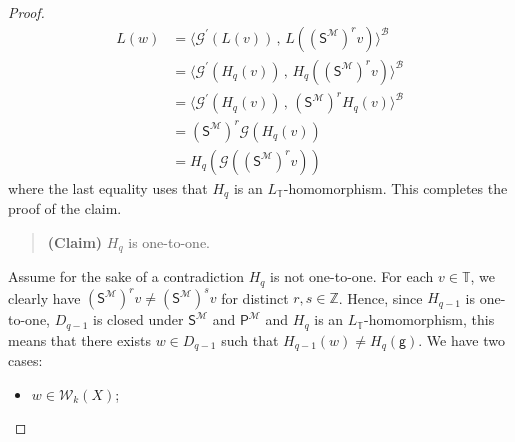 \documentclass[10pt,a4paper, openany,  oldfontcommands]{memoir}
\newtheorem{open problem} [theorem] {Open Problem}
\newtheorem{open question} [theorem] {Open Question}
\renewcommand{\mathrm}{\mathsf}
\begin{document}
\begin{proof}
\begin{align*}
L(w)    
&=  
 \langle      \mathcal{G}^{  \prime }  \left(   L(v)  \right)    \,  ,  \,  L(  \left(  \mathrm{S}^{  \mathcal{M}  }  \right)^r v)  \rangle^{  \mathcal{B}  } 
\\
&=  \langle      \mathcal{G}^{  \prime }  \left(   H_q (v)  \right)    \,  ,  \,  H_q (  \left(  \mathrm{S}^{  \mathcal{M}  }  \right)^r v)  \rangle^{  \mathcal{B}  } 
\\
&= \langle      \mathcal{G}^{  \prime }  \left(   H_q (v)  \right)    \,  ,  \,  \left(  \mathrm{S}^{  \mathcal{M}  }  \right)^r     H_q (  v)  \rangle^{  \mathcal{B}  } 
\\
&=   \left(  \mathrm{S}^{  \mathcal{M}  }  \right)^r      \mathcal{G}  \left(   H_q (v)  \right)  
\\
&=    H_q  \left(    \mathcal{G}  \left(  \left(  \mathrm{S}^{  \mathcal{M}  }  \right)^r  v   \right)    \right) 
\end{align*}
where the last equality uses that  $  H_q  $ is an $L_{ \mathbb{T}  }  $-homomorphism. 
This completes the proof of the claim. 

 
 
   \begin{quote} {\bf (Claim)} \;\;\;\;\;\;    
$  H_q  $  is  one-to-one. 
 \end{quote}  

Assume for the sake of a contradiction  $  H_q  $  is not one-to-one. 
For  each $  v  \in  \mathbb{T}  $,  we clearly have  $  \left(  \mathrm{S}^{  \mathcal{M}  }  \right)^r   v  \neq 
  \left(  \mathrm{S}^{  \mathcal{M}  }  \right)^s   v    $
  for distinct  $  r, s  \in  \mathbb{Z} $. 
  Hence,   since  $  H_{ q- 1  }  $  is one-to-one, $  D_{ q-1}  $  is closed under   $  \mathrm{S}^{  \mathcal{M}  }   $  
  and   $ \mathrm{P}^{  \mathcal{M}  }  $   and   $H_q   $  is an  $  L_{  \mathbb{T}  } $-homomorphism, 
  this means that  there   exists   $  w  \in D_{ q-1}  $  such that    $  H_{ q-1 } (w)  \neq  H_q  \left(  \mathsf{g} \right)   $. 
We have two cases: 
\begin{itemize}
\item[(I)]   $  w  \in  \mathcal{W}_k  \left( X  \right)  $; 



\end{itemize}
\end{proof}
\end{document}
